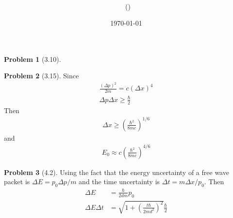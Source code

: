 \documentclass[twoside,11pt]{article}
\title{{\lms \Code \ \Ass}}
\author{\lms \name \ (\href{mailto:\mail}{\mail})}
\date{\sffamily \today}
\makeatletter
\theoremstyle{definition}
\newtheorem{problem}{Problem}
\theoremstyle{remark}
\newtheorem*{remark}{Remark}
\renewcommand{\maketitle}{\bgroup\setlength{\parindent}{0pt}
\begin{flushleft}
  \textbf{\Large\@title}

  \@author
\end{flushleft}\egroup
}
\makeatother
\begin{document}
\maketitle
\thispagestyle{title}


\begin{problem}[3.10]
\end{problem}


\begin{problem}[3.15]
Since
\begin{align*}
    \frac{(\Delta p)^2}{2m} = c(\Delta x)^4\\
    \Delta p\Delta x\geq \frac{\hbar}{2}
\end{align*}
Then
\begin{align*}
    \Delta x \geq \left(\frac{\hbar^2}{8mc}\right)^{1/6}
\end{align*}
and
\begin{align*}
    E_0\approx c\left(\frac{\hbar^2}{8mc}\right)^{4/6}
\end{align*}
\end{problem}


\begin{problem}[4.2]
    Using the fact that the energy uncertainty of a free wave packet is
    $\Delta E = p_0\Delta p/m$ and the time uncertainty is
    $\Delta t = m\Delta x/p_0$.
    Then 
    \begin{align*}
        \Delta E &= \frac{\hbar}{2dm}p_0\\
        \Delta E\Delta t &= \sqrt{1+\left(\frac{t\hbar}{2md^2}\right)^2}\frac{\hbar}{2}
    \end{align*}
\end{problem}
\end{document}
